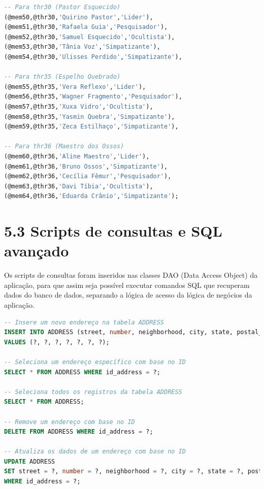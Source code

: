 \documentclass[12pt,a4paper]{report}
\begin{document}
\begin{lstlisting}[language=SQL, caption=population.sql]
-- Para thr30 (Pastor Esquecido)
(@mem50,@thr30,'Quirino Pastor','Lider'),
(@mem51,@thr30,'Rafaela Guia','Pesquisador'),
(@mem52,@thr30,'Samuel Esquecido','Ocultista'),
(@mem53,@thr30,'Tânia Voz','Simpatizante'),
(@mem54,@thr30,'Ulisses Perdido','Simpatizante'),

-- Para thr35 (Espelho Quebrado)
(@mem55,@thr35,'Vera Reflexo','Lider'),
(@mem56,@thr35,'Wagner Fragmento','Pesquisador'),
(@mem57,@thr35,'Xuxa Vidro','Ocultista'),
(@mem58,@thr35,'Yasmin Quebra','Simpatizante'),
(@mem59,@thr35,'Zeca Estilhaço','Simpatizante'),

-- Para thr36 (Maestro dos Ossos)
(@mem60,@thr36,'Aline Maestro','Lider'),
(@mem61,@thr36,'Bruno Ossos','Simpatizante'),
(@mem62,@thr36,'Cecília Fêmur','Pesquisador'),
(@mem63,@thr36,'Davi Tíbia','Ocultista'),
(@mem64,@thr36,'Eduarda Crânio','Simpatizante');
\end{lstlisting}

\section{5.3 Scripts de consultas e SQL avançado}
Os scripts de consultas foram inseridos nas classes DAO (Data Access Object) da aplicação, para que assim seja possível executar comandos SQL que recuperam dados do banco de dados, separando a lógica de acesso da lógica de negócios da aplicação.
\begin{lstlisting}[language=SQL, caption=Consultas feitas em AddressDAO]
-- Insere um novo endereço na tabela ADDRESS
INSERT INTO ADDRESS (street, number, neighborhood, city, state, postal_code, id_address) 
VALUES (?, ?, ?, ?, ?, ?, ?);

-- Seleciona um endereço específico com base no ID
SELECT * FROM ADDRESS WHERE id_address = ?;

-- Seleciona todos os registros da tabela ADDRESS
SELECT * FROM ADDRESS;

-- Remove um endereço com base no ID
DELETE FROM ADDRESS WHERE id_address = ?;

-- Atualiza os dados de um endereço com base no ID
UPDATE ADDRESS 
SET street = ?, number = ?, neighborhood = ?, city = ?, state = ?, postal_code = ? 
WHERE id_address = ?;
\end{lstlisting}
\end{document}
